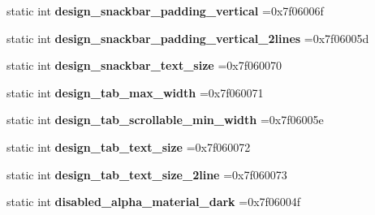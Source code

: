 \begin{DoxyCompactItemize}
static int {\bfseries design\+\_\+snackbar\+\_\+padding\+\_\+vertical} =0x7f06006f
\item 
\mbox{\label{classandroid_1_1support_1_1v7_1_1cardview_1_1R_1_1dimen_a29f4be923c2f04606e9e36dd48c576a5}} 
static int {\bfseries design\+\_\+snackbar\+\_\+padding\+\_\+vertical\+\_\+2lines} =0x7f06005d
\item 
\mbox{\label{classandroid_1_1support_1_1v7_1_1cardview_1_1R_1_1dimen_af79e0d52d12f9e260a3b904108cac084}} 
static int {\bfseries design\+\_\+snackbar\+\_\+text\+\_\+size} =0x7f060070
\item 
\mbox{\label{classandroid_1_1support_1_1v7_1_1cardview_1_1R_1_1dimen_a0c17392d16771c1996201f322ff39837}} 
static int {\bfseries design\+\_\+tab\+\_\+max\+\_\+width} =0x7f060071
\item 
\mbox{\label{classandroid_1_1support_1_1v7_1_1cardview_1_1R_1_1dimen_abb1094852ee4dad60a5d9824811cb89b}} 
static int {\bfseries design\+\_\+tab\+\_\+scrollable\+\_\+min\+\_\+width} =0x7f06005e
\item 
\mbox{\label{classandroid_1_1support_1_1v7_1_1cardview_1_1R_1_1dimen_a71606820f5d5d156890d639867071950}} 
static int {\bfseries design\+\_\+tab\+\_\+text\+\_\+size} =0x7f060072
\item 
\mbox{\label{classandroid_1_1support_1_1v7_1_1cardview_1_1R_1_1dimen_a17625963ccb245c5461a7d610d46d05c}} 
static int {\bfseries design\+\_\+tab\+\_\+text\+\_\+size\+\_\+2line} =0x7f060073
\item 
\mbox{\label{classandroid_1_1support_1_1v7_1_1cardview_1_1R_1_1dimen_a02aae90fa7f89fa04638ac1da3fde01e}} 
static int {\bfseries disabled\+\_\+alpha\+\_\+material\+\_\+dark} =0x7f06004f
\item 
\mbox{\label{classandroid_1_1support_1_1v7_1_1cardview_1_1R_1_1dimen_a07ca33f89f521351ddeedeb0afd39c75}} 

\end{DoxyCompactItemize}
